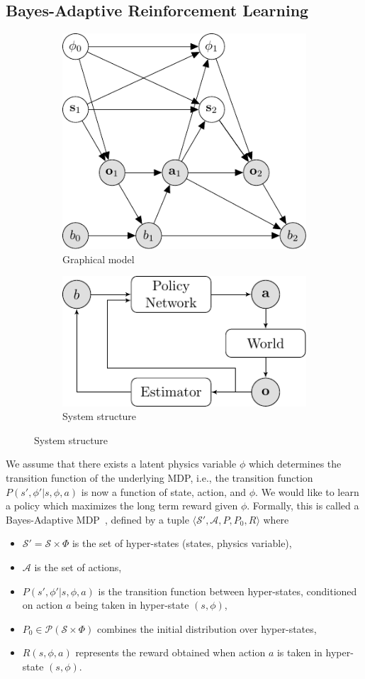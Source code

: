 \documentclass{article}
\begin{document}
\subsection{Bayes-Adaptive Reinforcement Learning}
\begin{figure}[h!]
\begin{subfigure}[b]{0.5\textwidth}
\centering
\includegraphics[width=0.5\linewidth]{figs/model.pdf}
\caption{Graphical model}
\end{subfigure}
\begin{subfigure}[b]{0.5\textwidth}
\centering
\includegraphics[width=0.5\linewidth]{figs/system_structure.pdf}
\caption{System structure}
\end{subfigure}
\end{figure}

We assume that there exists a latent physics variable $\phi$ which determines the transition function of the underlying MDP, i.e., the transition function  $P(s',\phi' |s, \phi, a)$ is now a function of state, action, and $\phi$. We would like to learn a policy which maximizes the long term reward given $\phi$. Formally, this is called a Bayes-Adaptive MDP~\cite{ghavamzadeh2015bayesian, ross2008bayes, guez2012efficient}, defined by a tuple $\langle \mathcal{S}', \mathcal{A}, P, P_0, R \rangle$ where
\begin{itemize}
\item $\mathcal{S'} = \mathcal{S}\times \Phi$ is the set of hyper-states (states, physics variable),
\item $\mathcal{A}$ is the set of actions,
\item $P(s',\phi'|s, \phi, a)$ is the transition function between hyper-states, conditioned
on action $a$ being taken in hyper-state $(s, \phi)$,
\item $P_0\in \mathcal{P}(\mathcal{S} \times \Phi)$ combines the initial distribution over hyper-states,
\item $R(s, \phi, a)$ represents the reward obtained when action $a$ is
taken in hyper-state $(s,\phi)$.
\end{itemize}
\end{document}
